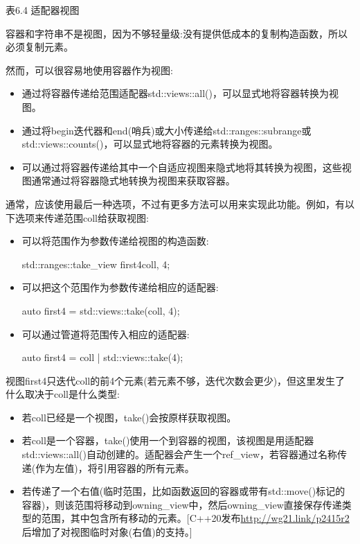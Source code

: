 \begin{center}
表6.4 适配器视图
\end{center}


容器和字符串不是视图，因为不够轻量级:没有提供低成本的复制构造函数，所以必须复制元素。

然而，可以很容易地使用容器作为视图:

\begin{itemize}
\item
通过将容器传递给范围适配器std::views::all()，可以显式地将容器转换为视图。

\item
通过将begin迭代器和end(哨兵)或大小传递给std::ranges::subrange或std::views::counts()，可以显式地将容器的元素转换为视图。

\item
可以通过将容器传递给其中一个自适应视图来隐式地将其转换为视图，这些视图通常通过将容器隐式地转换为视图来获取容器。
\end{itemize}

通常，应该使用最后一种选项，不过有更多方法可以用来实现此功能。例如，有以下选项来传递范围coll给获取视图:

\begin{itemize}
\item
可以将范围作为参数传递给视图的构造函数:

\begin{cpp}
std::ranges::take_view first4{coll, 4};
\end{cpp}

\item
可以把这个范围作为参数传递给相应的适配器:

\begin{cpp}
auto first4 = std::views::take(coll, 4);
\end{cpp}

\item
可以通过管道将范围传入相应的适配器:

\begin{cpp}
auto first4 = coll | std::views::take(4);
\end{cpp}
\end{itemize}

视图first4只迭代coll的前4个元素(若元素不够，迭代次数会更少)，但这里发生了什么取决于coll是什么类型:

\begin{itemize}
\item
若coll已经是一个视图，take()会按原样获取视图。

\item
若coll是一个容器，take()使用一个到容器的视图，该视图是用适配器std::views::all()自动创建的。适配器会产生一个ref\_view，若容器通过名称传递(作为左值)，将引用容器的所有元素。

\item
若传递了一个右值(临时范围，比如函数返回的容器或带有std::move()标记的容器)，则该范围将移动到owning\_view中，然后owning\_view直接保存传递类型的范围，其中包含所有移动的元素。[C++20发布\url{http://wg21.link/p2415r2}后增加了对视图临时对象(右值)的支持。]
\end{itemize}

